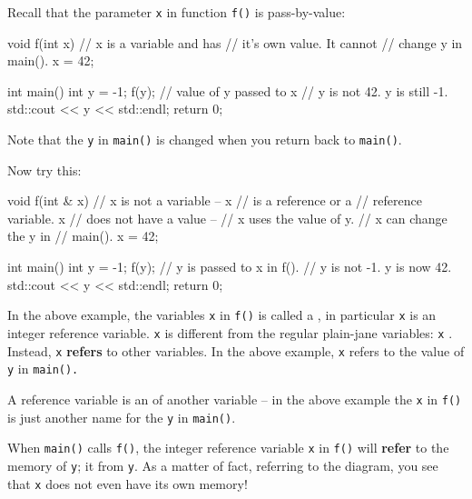\newpage{}

Recall that the parameter \texttt{x} in function \texttt{f()} is pass-by-value:

\begin{consolethree}[escapeinside=||]
void f(int x) // x is a variable and has
              // it's own value. It cannot
              // change y in main().
{
    x = 42;
}

int main()
{
    int y = -1;
    f(y); // value of y passed to x
    // y is not 42. y is still -1.
    std::cout << y << std::endl;
    return 0;
}
\end{consolethree}

Note that the \texttt{y} in \texttt{main()} is  changed when you return back to \texttt{main()}.

Now try this:

\begin{consolethree}[escapeinside=||]
void f(int & x) // x is not a variable -- x
                // is a reference or a
                // reference variable. x
                // does not have a value --
                // x uses the value of y.
                // x can change the y in
                // main().
{
    x = 42;
}

int main()
{
    int y = -1;
    f(y); // y is passed to x in f().
    // y is not -1. y is now 42.
    std::cout << y << std::endl;
    return 0;
}
\end{consolethree}

In the above example, the variables \texttt{x} in \texttt{f()} is called a , in particular \texttt{x} is an integer reference variable. \texttt{x} is different from the regular plain-jane variables: \texttt{x} . Instead, \texttt{x} \textbf{refers} to other variables. In the above example, \texttt{x} refers to the value of \texttt{y} in \texttt{main().}

A reference variable is an  of another variable -- in the above example the \texttt{x} in \texttt{f()} is just another name for the \texttt{y} in \texttt{main()}.

When \texttt{main()} calls \texttt{f()}, the integer reference variable \texttt{x} in \texttt{f()} will \textbf{refer} to the memory of \texttt{y}; it  from \texttt{y}. As a matter of fact, referring to the diagram, you see that \texttt{x} does not even have its own memory!

